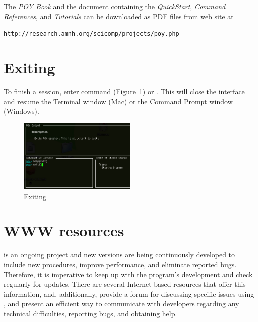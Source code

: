 The \emph{POY Book} and the document containing the \emph{\poy QuickStart}, \emph{\poy Command References}, and \emph{\poy Tutorials} can be downloaded as PDF files from \poy web site at
\begin{center}
\texttt{http://research.amnh.org/scicomp/projects/poy.php}
\end{center}

\section{Exiting}
To finish a \poy session, enter command  (Figure~\ref{fig:exithelp}) or . This will close the \poy interface and resume the Terminal window (Mac) or the Command Prompt window (Windows).

\begin{figure}[]
    \begin{center}
        \includegraphics[width=0.5\textwidth]{figures/exithelp.jpg}
    \end{center}
    \caption{Exiting \poy}
    \label{fig:exithelp}
\end{figure}

\section{WWW resources}
\poy is an ongoing project and new versions are being continuously developed to include new procedures, improve performance, and eliminate reported bugs. Therefore, it is imperative to keep up with the program's development and check regularly for updates. There are several Internet-based resources that offer this information, and, additionally, provide a forum for discussing specific issues using \poy, and present an efficient way to communicate with \poy developers regarding any technical difficulties, reporting bugs, and obtaining help.


